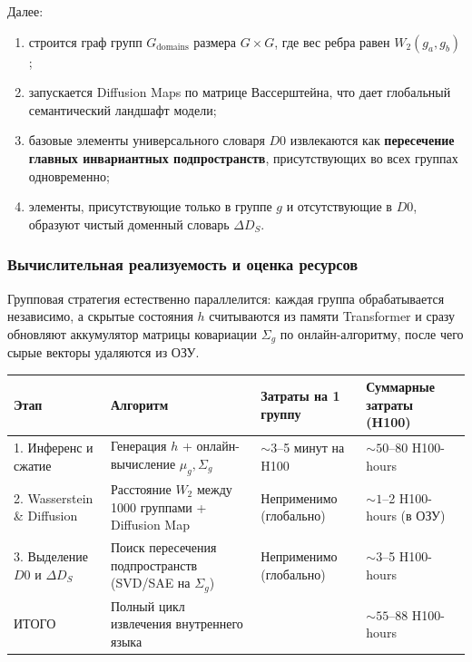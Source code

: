 \documentclass[11pt,a4paper]{article}
\begin{document}
Далее:
\begin{enumerate}
    \item строится граф групп $G_{\text{domains}}$ размера $G\times G$, где вес ребра равен $W_2(g_a,g_b)$;
    \item запускается Diffusion Maps по матрице Вассерштейна, что дает глобальный семантический ландшафт модели;
    \item базовые элементы универсального словаря $D0$ извлекаются как \textbf{пересечение главных инвариантных подпространств}, присутствующих во всех группах одновременно;
    \item элементы, присутствующие только в группе $g$ и отсутствующие в $D0$, образуют чистый доменный словарь $\Delta D_S$.
\end{enumerate}

\subsubsection*{Вычислительная реализуемость и оценка ресурсов}

Групповая стратегия естественно параллелится: каждая группа обрабатывается независимо, а скрытые состояния $h$ считываются из памяти Transformer и сразу обновляют аккумулятор матрицы ковариации $\Sigma_g$ по онлайн-алгоритму, после чего сырые векторы удаляются из ОЗУ.

\begin{table}[H]
\centering
\small
\begin{tabular}{p{3.0cm} p{5.1cm} p{3.3cm} p{3.2cm}}
\toprule
\textbf{Этап} & \textbf{Алгоритм} & \textbf{Затраты на 1 группу} & \textbf{Суммарные затраты (H100)} \\
\midrule
1. Инференс и сжатие & Генерация $h$ + онлайн-вычисление $\mu_g,\Sigma_g$ & $\sim3$--5 минут на H100 & $\sim50$--80 H100-hours \\
2. Wasserstein \& Diffusion & Расстояние $W_2$ между 1000 группами + Diffusion Map & Неприменимо (глобально) & $\sim1$--2 H100-hours (в ОЗУ) \\
3. Выделение $D0$ и $\Delta D_S$ & Поиск пересечения подпространств (SVD/SAE на $\Sigma_g$) & Неприменимо (глобально) & $\sim3$--5 H100-hours \\
\midrule
ИТОГО & Полный цикл извлечения внутреннего языка & & $\sim55$--88 H100-hours \\
\bottomrule
\end{tabular}
\end{table}
\end{document}
